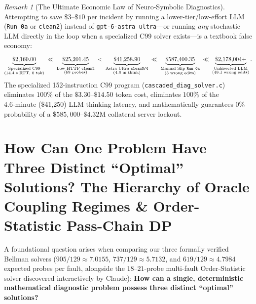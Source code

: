 \documentclass[11pt,a4paper]{article}
\theoremstyle{definition}
\theoremstyle{remark}
\newtheorem{remark}[theorem]{Remark}
\begin{document}
\begin{remark}[The Ultimate Economic Law of Neuro-Symbolic Diagnostics]
Attempting to save $\$3\text{--}\$10$ per incident by running a lower-tier/low-effort LLM (\texttt{Run 0a} or \texttt{clean2}) instead of \texttt{gpt-6-astra ultra}---or running \emph{any} stochastic LLM directly in the loop when a specialized C99 solver exists---is a textbook false economy:
\begin{equation}
    \underbrace{\$2{,}160.00}_{\substack{\text{Specialized C99} \\ \text{(14.4 s RTT, 0 tok)}}}
    \;\ll\;
    \underbrace{\$25{,}201.45}_{\substack{\text{Low HTTP \texttt{clean2}} \\ \text{(69 probes)}}}
    \;<\;
    \underbrace{\$41{,}258.90}_{\substack{\text{Astra Ultra \texttt{clean3/4}} \\ \text{(4.6 m think)}}}
    \;\ll\;
    \underbrace{\$587{,}400.35}_{\substack{\text{Manual Slip \texttt{Run 0a}} \\ \text{(3 wrong edits)}}}
    \;\ll\;
    \underbrace{\$2{,}178{,}004+}_{\substack{\text{Unbisected LLM} \\ \text{(48.1 wrong edits)}}}.
\end{equation}
The specialized 152-instruction C99 program (\texttt{cascaded\_diag\_solver.c}) eliminates $100\%$ of the $\$3.30\text{--}\$14.50$ token cost, eliminates $100\%$ of the $4.6\text{-minute}$ ($\$$41,250) LLM thinking latency, and mathematically guarantees $0\%$ probability of a $\$585{,}000\text{--}\$4.32\text{M}$ collateral server lockout.
\end{remark}

\section{How Can One Problem Have Three Distinct ``Optimal'' Solutions? The Hierarchy of Oracle Coupling Regimes \& Order-Statistic Pass-Chain DP}

A foundational question arises when comparing our three formally verified Bellman solvers ($905/129 \approx 7.0155$, $737/129 \approx 5.7132$, and $619/129 \approx 4.7984$ expected probes per fault, alongside the $18\text{--}21$-probe multi-fault Order-Statistic solver discovered interactively by Claude): \textbf{How can a single, deterministic mathematical diagnostic problem possess three distinct ``optimal'' solutions?}
\end{document}
